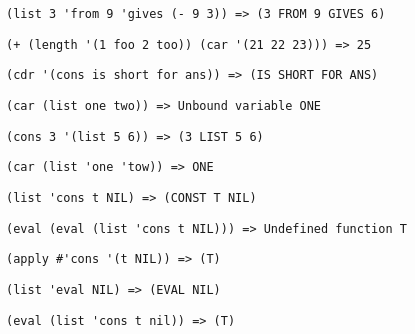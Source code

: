 \problem \hfill

\begin{lstlisting}
(list 3 'from 9 'gives (- 9 3)) => (3 FROM 9 GIVES 6) 
\end{lstlisting}


\problem \hfill

\begin{lstlisting}
(+ (length '(1 foo 2 too)) (car '(21 22 23))) => 25
\end{lstlisting}


\problem \hfill

\begin{lstlisting}
(cdr '(cons is short for ans)) => (IS SHORT FOR ANS)
\end{lstlisting}


\problem \hfill

\begin{lstlisting}
(car (list one two)) => Unbound variable ONE
\end{lstlisting}


\problem \hfill

\begin{lstlisting}
(cons 3 '(list 5 6)) => (3 LIST 5 6)
\end{lstlisting}


\problem \hfill

\begin{lstlisting}
(car (list 'one 'tow)) => ONE
\end{lstlisting}


\problem \hfill

\begin{lstlisting}
(list 'cons t NIL) => (CONST T NIL) 
\end{lstlisting}


\problem \hfill

\begin{lstlisting}
(eval (eval (list 'cons t NIL))) => Undefined function T
\end{lstlisting}


\problem \hfill

\begin{lstlisting}
(apply #'cons '(t NIL)) => (T) 
\end{lstlisting}


\problem \hfill
\begin{lstlisting}
(list 'eval NIL) => (EVAL NIL)
\end{lstlisting}


\problem \hfill
\begin{lstlisting}
(eval (list 'cons t nil)) => (T)
\end{lstlisting}


